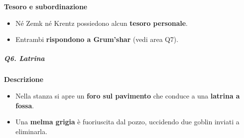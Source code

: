 \documentclass{article}
\begin{document}
\textbf{Tesoro e subordinazione}
\begin{itemize}
    \item Né Zemk né Krentz possiedono alcun \textbf{tesoro personale}.
    \item Entrambi \textbf{rispondono a Grum’shar} (vedi area Q7).
\end{itemize}

\vspace{0.5cm}
\subparagraph{Q6. Latrina}
\textbf{Descrizione}
\begin{itemize}
    \item Nella stanza si apre un \textbf{foro sul pavimento} che conduce a una \textbf{latrina a fossa}.
    \item Una \textbf{melma grigia} è fuoriuscita dal pozzo, uccidendo due goblin inviati a eliminarla.
\end{itemize}
\end{document}
